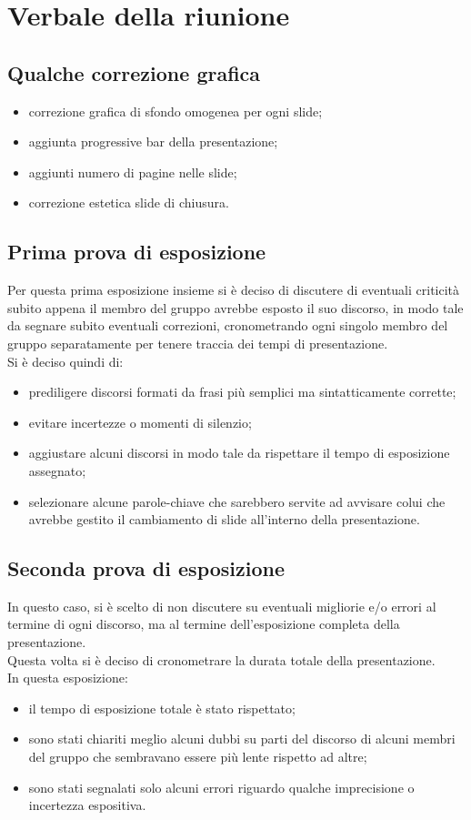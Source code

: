 \section{Verbale della riunione}
\subsection{Qualche correzione grafica}
\begin{itemize}
\item correzione grafica di sfondo omogenea per ogni slide;
\item aggiunta progressive bar della presentazione;
\item aggiunti numero di pagine nelle slide;
\item correzione estetica slide di chiusura.
\end{itemize}

\subsection{Prima prova di esposizione}
Per questa prima esposizione insieme si è deciso di discutere di eventuali criticità subito appena il membro del gruppo avrebbe esposto il suo discorso, in modo tale da segnare subito eventuali correzioni, cronometrando ogni singolo membro del gruppo separatamente per tenere traccia dei tempi di presentazione.
\\Si è deciso quindi di:
\begin{itemize}
\item prediligere discorsi formati da frasi più semplici ma sintatticamente corrette;
\item evitare incertezze o momenti di silenzio;
\item aggiustare alcuni discorsi in modo tale da rispettare il tempo di esposizione assegnato;
\item selezionare alcune parole-chiave che sarebbero servite ad avvisare colui che avrebbe gestito il cambiamento di slide all'interno della presentazione.
\end{itemize}

\subsection{Seconda prova di esposizione}
In questo caso, si è scelto di non discutere su eventuali migliorie e/o errori al termine di ogni discorso, ma al termine dell'esposizione completa della presentazione. \\Questa volta si è deciso di cronometrare la durata totale della presentazione.
\\In questa esposizione: 
\begin{itemize}
\item il tempo di esposizione totale è stato rispettato;
\item sono stati chiariti meglio alcuni dubbi su parti del discorso di alcuni membri del gruppo che sembravano essere più lente rispetto ad altre;
\item sono stati segnalati solo alcuni errori riguardo qualche imprecisione o incertezza espositiva.
\end{itemize}
 
